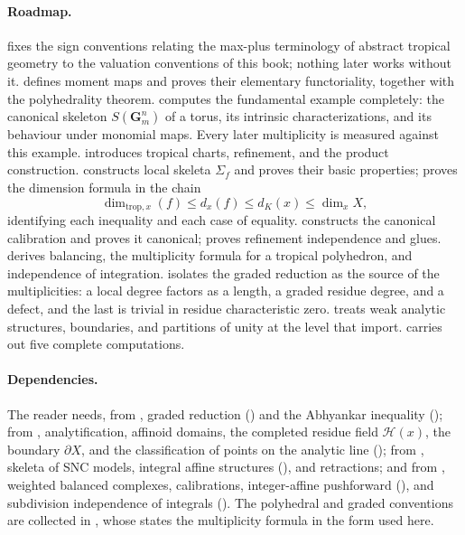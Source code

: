 \paragraph{Roadmap.}
 fixes the sign conventions relating the max-plus
terminology of abstract tropical geometry to the valuation conventions of
this book; nothing later works without it.  defines
moment maps and proves their elementary functoriality, together with the
polyhedrality theorem.  computes the fundamental
example completely: the canonical skeleton $S(\mathbf G_m^n)$ of a torus, its
intrinsic characterizations, and its behaviour under monomial maps. Every
later multiplicity is measured against this example.
 introduces tropical charts, refinement, and the
product construction.  constructs local skeleta
$\Sigma_f$ and proves their basic properties;
 proves the dimension formula in the chain
\[
 \dim_{\mathrm{trop},x}(f)\le d_x(f)\le d_K(x)\le\dim_xX,
\]
identifying each inequality and each case of equality.
 constructs the canonical calibration and proves
it canonical;  proves refinement independence and
glues.  derives balancing, the multiplicity
formula for a tropical polyhedron, and independence of integration.
 isolates the graded reduction as the source of the
multiplicities: a local degree factors as a length, a graded residue degree,
and a defect, and the last is trivial in residue characteristic zero.
 treats weak analytic structures, boundaries, and
partitions of unity at the level that
 import.
 carries out five complete computations.

\paragraph{Dependencies.}
The reader needs, from , graded reduction
() and the Abhyankar inequality
(); from , analytification,
affinoid domains, the completed residue field $\mathcal H(x)$, the boundary
$\partial X$, and the classification of points on the analytic line
(); from , skeleta of SNC
models, integral affine structures (), and
retractions; and from
, weighted balanced
complexes, calibrations, integer-affine pushforward
(), and subdivision independence of
integrals (). The polyhedral and
graded conventions are collected in , whose
 states the multiplicity formula in the
form used here.

